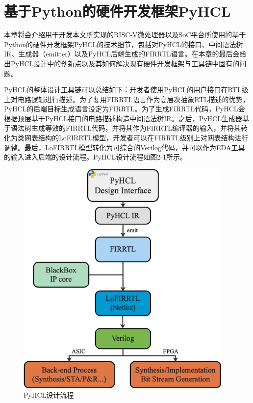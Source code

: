 \chapter{基于Python的硬件开发框架PyHCL}

本章将会介绍用于开发本文所实现的RISC-V微处理器以及SoC平台所使用的基于Python的硬件开发框架PyHCL的技术细节，包括对PyHCL的接口、中间语法树IR、生成器（emitter）以及PyHCL后端生成的FIRRTL语言。在本章的最后会给出PyHCL设计中的创新点以及其如何解决现有硬件开发框架与工具链中固有的问题。

PyHCL的整体设计工具链可以总结如下：开发者使用PyHCL的用户接口在RTL级上对电路逻辑进行描述。为了复用FIRRTL语言作为高层次抽象RTL描述的优势，PyHCL的后端目标生成语言设定为FIRRTL。为了生成FIRRTL代码，PyHCL会根据顶层基于PyHCL接口的电路描述构造中间语法树IR。之后，PyHCL生成器基于语法树生成等效的FIRRTL代码，并将其作为FIRRTL编译器的输入，并将其转化为类网表结构的LoFIRRTL模型，开发者可以在FIRRTL级别上对网表结构进行调整。最后，LoFIRRTL模型转化为可综合的Verilog代码，并可以作为EDA工具的输入进入后端的设计流程。PyHCL设计流程如图2-1所示。

\begin{figure}[htbp]
	\centering
	\includegraphics[width=0.95\textwidth]{Photos/PyHCL-Overview.png}
	\caption{PyHCL设计流程}
\end{figure}


